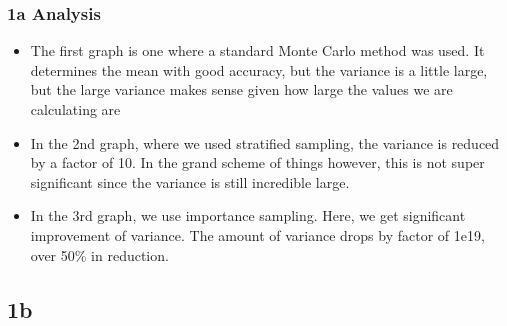 \documentclass[11pt]{article}
\providecommand{\tightlist}{%
      \setlength{\itemsep}{0pt}\setlength{\parskip}{0pt}}
\begin{document}
    \hypertarget{a-analysis}{%
\subsubsection{1a Analysis}\label{a-analysis}}

    \begin{itemize}
\tightlist
\item
  The first graph is one where a standard Monte Carlo method was used.
  It determines the mean with good accuracy, but the variance is a
  little large, but the large variance makes sense given how large the
  values we are calculating are
\item
  In the 2nd graph, where we used stratified sampling, the variance is
  reduced by a factor of 10. In the grand scheme of things however, this
  is not super significant since the variance is still incredible large.
\item
  In the 3rd graph, we use importance sampling. Here, we get significant
  improvement of variance. The amount of variance drops by factor of
  1e19, over 50\% in reduction.
\end{itemize}

    \hypertarget{b}{%
\subsection{1b}\label{b}}
\end{document}
